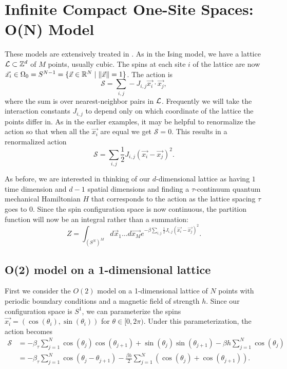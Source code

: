 \documentclass[10pt,reqno]{amsart}
\numberwithin{equation}{section}
\begin{document}
	\section{Infinite Compact One-Site Spaces: O(N) Model}
	
	These models are extensively treated in \cite{FradkinSusskind78,HamerKogutSusskind79,KogutGaugeSummary}. 
	As in the Ising model, we have a lattice $\mathcal{L} \subset \mathbb{Z}^d$ of $M$ points, usually cubic. 
	The spins at each site $i$ of the lattice are now $\vec{x_i} \in \Omega_0=S^{N-1} = \{\vec{x} \in \mathbb{R}^{N} \mid \|\vec{x}\|=1 \}$. 
	The action is
	\[\mathcal{S}=\sum_{i,j} -J_{i,j}\vec{x_i}\cdot\vec{x_j}, \] where the sum is over nearest-neighbor pairs in $\mathcal{L}$.
	Frequently we will take the interaction constants $J_{i,j}$ to depend only on which coordinate of the lattice the points differ in.
	As in the earlier examples, it may be helpful to renormalize the action so that when all the $\vec{x_i}$ are equal we get $\mathcal{S}=0$. 
	This results in a renormalized action
	\[\mathcal{S}=\sum_{i,j}\frac{1}{2} J_{i,j}(\vec{x_i}-\vec{x_j})^2. \]
	
	As before, we are interested in thinking of our $d$-dimensional lattice as having $1$ time dimension and $d-1$ spatial dimensions and finding a $\tau$-continuum quantum mechanical Hamiltonian $H$ that corresponds to the action as the lattice spacing $\tau$ goes to $0$.
	Since the spin configuration space is now continuous, the partition function will now be an integral rather than a summation:
	\[ Z=\int_{(S^N)^M} d\vec{x}_1\ldots d\vec{x_M} e^{-\beta\sum_{i,j}\frac{1}{2} J_{i,j}(\vec{x_i}-\vec{x_j})^2}. \]
	
	\subsection{O(2) model on a 1-dimensional lattice}
	
	First we consider the $O(2)$ model on a 1-dimensional lattice of $N$ points with periodic boundary conditions and a magnetic field of strength $h$.
	Since our configuration space is $S^1$, we can parameterize the spins $\vec{x_i}=(\cos(\theta_i),\sin(\theta_i))$ for $\theta \in [0,2\pi)$. 
	Under this parameterization, the action becomes
	\begin{align*}
		 \mathcal{S} &= -\beta_\tau \sum_{j=1}^N \cos(\theta_j)\cos(\theta_{j+1})+\sin(\theta_j)\sin(\theta_{j+1}) - \beta h  \sum_{j=1}^N \cos(\theta_j)\\
			&=  - \beta_\tau \sum_{j=1}^N \cos(\theta_j-\theta_{j+1}) - \frac{\beta h}{2}  \sum_{j=1}^N \left(\cos(\theta_j)+\cos(\theta_{j+1})\right). 
	\end{align*}
	
\end{document}
